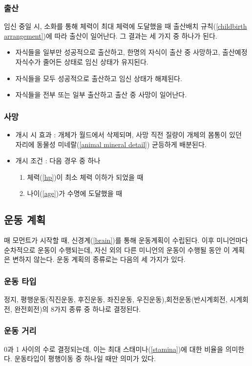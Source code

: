 \documentclass[a4paper,12pt]{article}
\begin{document}
\subsubsection{출산}\label{childbirth}
임신 중일 시, 소화를 통해 체력이 최대 체력에 도달했을 때 출산배치 규칙(\ref{childbirth arrangement})에 따라 출산이 일어난다. 그 결과는 세 가지 중 하나가 된다. 
\begin{itemize}
\item 자식들을 일부만 성공적으로 출산하고, 한명의 자식이 출산 중 사망하고, 출산예정자식수가 줄어든 상태로 임신 상태가 유지된다. 
\item 자식들을 모두 성공적으로 출산하고 임신 상태가 해제된다.  
\item 자식들을 전부 또는 일부 출산하고 출산 중 사망이 일어난다. 
\end{itemize} 
\subsubsection{사망}\label{death}
\begin{itemize}
\item 개시 시 효과 : 개체가 월드에서 삭제되며, 사망 직전 질량이 개체의 몸통이 있던 자리에 동물성 미네랄(\ref{animal mineral detail}) 균등하게 배분된다. 
\item 개시 조건 : 다음 경우 중 하나
\begin{enumerate}
\item 체력(\ref{hp})이 최소 체력 이하가 되었을 때
\item 나이(\ref{age})가 수명에 도달했을 때  
\end{enumerate}
\end{itemize} 

\subsection{운동 계획}\label{move plan}
매 모먼트가 시작할 때, 신경계(\ref{brain})를 통해 
운동계획이 수립된다. 이후 미니언마다 순차적으로 운동이  
수행되는데, 자신 외의 다른 미니언의 운동이 수행될 동안 이 계획은 변하지 않는다. 운동 계획의 종류로는 다음의 세 가지가 있다. 
\subsubsection{운동 타입}\label{move type}
정지, 평행운동(직진운동, 후진운동, 좌진운동, 우진운동),회전운동(반시계회전, 시계회전, 완전회전)의 8가지 종류 중 하나로 결정된다.
\subsubsection{운동 거리}\label{move distance}
0과 1 사이의 수로 결정되는데, 이는 최대 스태미나(\ref{stamina})에 대한 비율을 의미한다. 운동타입이 평행이동 중 하나일 때만 의미가 있다.
\end{document}
